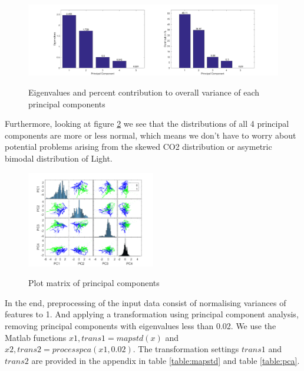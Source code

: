 \documentclass[a4paper, 11pt]{article}
\begin{document}
\begin{figure}[h]
  \caption{Eigenvalues and percent contribution to overall variance of each principal components}
  \centering
    \includegraphics[width=1\textwidth]{../eigenvalues.png}
    \label{fig:eigenvalues}
\end{figure}

Furthermore, looking at figure \ref{fig:pca_plotmatrix} we see that the distributions of all 4 principal components are more or less normal, which means we don't have to worry about potential problems arising from the skewed CO2 distribution or asymetric bimodal distribution of Light. 

\begin{figure}[h]
  \caption{Plot matrix of principal components}
  \centering
    \includegraphics[width=0.5\textwidth]{../pca_plotmatrix.png}
    \label{fig:pca_plotmatrix}
\end{figure}

In the end, preprocessing of the input data consist of normalising variances of features to 1. And applying a transformation using principal component analysis, removing principal components with eigenvalues less than 0.02. We use the Matlab functions $x1, trans1 = mapstd(x)$ and $x2, trans2 = processpca(x1, 0.02)$. The transformation settings $trans1$ and $trans2$ are provided in the appendix in table \ref{table:mapstd} and table \ref{table:pca}.
  
\end{document}
